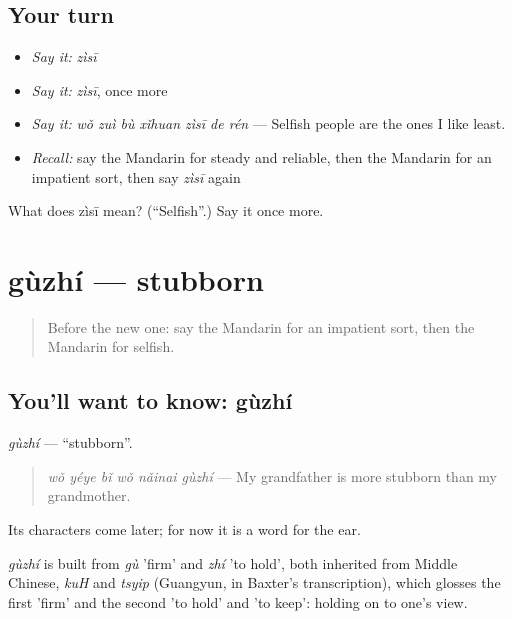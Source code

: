 \subsection*{Your turn}
\begin{itemize}
\raggedright
  \item \emph{Say it:} \emph{zìsī}
  \item \emph{Say it:} \emph{zìsī}, once more
  \item \emph{Say it:} \emph{wǒ zuì bù xǐhuan zìsī de rén} — Selfish people are the ones I like least.
  \item \emph{Recall:} say the Mandarin for steady and reliable, then the Mandarin for an impatient sort, then say \emph{zìsī} again
\end{itemize}

\begin{tcolorbox}[breakable,colback=teal!4,colframe=teal!35!black,title={Before you move on}]
What does zìsī mean? (\textquotedblleft{}Selfish\textquotedblright{}.) Say it once more.
\end{tcolorbox}
\section[gùzhí]{gùzhí — stubborn}

\label{lesson:ZH-C470-guzhi}



\begin{quote}
Before the new one: say the Mandarin for an impatient sort, then the Mandarin for selfish.
\end{quote}

\subsection*{You'll want to know: gùzhí}
\emph{gùzhí} — \textquotedblleft{}stubborn\textquotedblright{}.

\begin{quote}
\emph{wǒ yéye bǐ wǒ nǎinai gùzhí} — My grandfather is more stubborn than my grandmother.
\end{quote}

Its characters come later; for now it is a word for the ear.

\begin{cousinweb}
\emph{gùzhí} is built from \emph{gù} 'firm' and \emph{zhí} 'to hold', both inherited from Middle Chinese, \emph{kuH} and \emph{tsyip} (Guangyun, in Baxter's transcription), which glosses the first 'firm' and the second 'to hold' and 'to keep': holding on to one's view.
\end{cousinweb}

